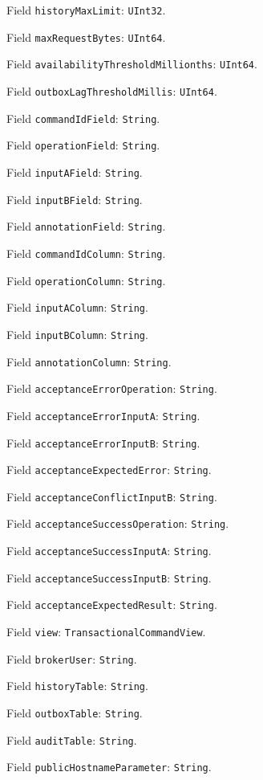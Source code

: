\documentclass[11pt]{article}
\begin{document}
\noindent Field \texttt{historyMaxLimit}: \texttt{UInt32}.\par
\noindent Field \texttt{maxRequestBytes}: \texttt{UInt64}.\par
\noindent Field \texttt{availabilityThresholdMillionths}: \texttt{UInt64}.\par
\noindent Field \texttt{outboxLagThresholdMillis}: \texttt{UInt64}.\par
\noindent Field \texttt{commandIdField}: \texttt{String}.\par
\noindent Field \texttt{operationField}: \texttt{String}.\par
\noindent Field \texttt{inputAField}: \texttt{String}.\par
\noindent Field \texttt{inputBField}: \texttt{String}.\par
\noindent Field \texttt{annotationField}: \texttt{String}.\par
\noindent Field \texttt{commandIdColumn}: \texttt{String}.\par
\noindent Field \texttt{operationColumn}: \texttt{String}.\par
\noindent Field \texttt{inputAColumn}: \texttt{String}.\par
\noindent Field \texttt{inputBColumn}: \texttt{String}.\par
\noindent Field \texttt{annotationColumn}: \texttt{String}.\par
\noindent Field \texttt{acceptanceErrorOperation}: \texttt{String}.\par
\noindent Field \texttt{acceptanceErrorInputA}: \texttt{String}.\par
\noindent Field \texttt{acceptanceErrorInputB}: \texttt{String}.\par
\noindent Field \texttt{acceptanceExpectedError}: \texttt{String}.\par
\noindent Field \texttt{acceptanceConflictInputB}: \texttt{String}.\par
\noindent Field \texttt{acceptanceSuccessOperation}: \texttt{String}.\par
\noindent Field \texttt{acceptanceSuccessInputA}: \texttt{String}.\par
\noindent Field \texttt{acceptanceSuccessInputB}: \texttt{String}.\par
\noindent Field \texttt{acceptanceExpectedResult}: \texttt{String}.\par
\noindent Field \texttt{view}: \texttt{TransactionalCommandView}.\par
\noindent Field \texttt{brokerUser}: \texttt{String}.\par
\noindent Field \texttt{historyTable}: \texttt{String}.\par
\noindent Field \texttt{outboxTable}: \texttt{String}.\par
\noindent Field \texttt{auditTable}: \texttt{String}.\par
\noindent Field \texttt{publicHostnameParameter}: \texttt{String}.\par
\end{document}
